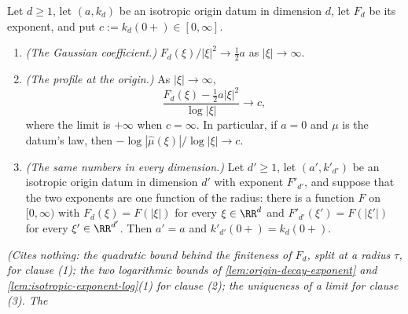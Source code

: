 \begin{theorem}
\label{cor:origin-profile-exponent}
\leanok
Let $d \ge 1$, let $(a, k_d)$ be an isotropic origin datum in dimension $d$, let $F_d$ be its
exponent, and put $c := k_d(0{+}) \in [0,\infty]$.
\begin{enumerate}
\item \emph{(The Gaussian coefficient.)} $F_d(\xi)/|\xi|^2 \to \tfrac12 a$ as $|\xi| \to \infty$.
\item \emph{(The profile at the origin.)} As $|\xi| \to \infty$,
\[
  \frac{F_d(\xi) - \tfrac12 a|\xi|^2}{\log|\xi|} \to c ,
\]
where the limit is $+\infty$ when $c = \infty$. In particular, if $a = 0$ and $\mu$ is the datum's
law, then $-\log|\widehat\mu(\xi)|/\log|\xi| \to c$.
\item \emph{(The same numbers in every dimension.)} Let $d' \ge 1$, let $(a', k'_{d'})$ be an
isotropic origin datum in dimension $d'$ with exponent $F'_{d'}$, and suppose that the two exponents
are one function of the radius: there is a function $F$ on $[0,\infty)$ with $F_d(\xi) = F(|\xi|)$
for every $\xi \in \RR^d$ and $F'_{d'}(\xi') = F(|\xi'|)$ for every $\xi' \in \RR^{d'}$. Then
$a' = a$ and $k'_{d'}(0{+}) = k_d(0{+})$.
\end{enumerate}
\statusT\quad\emph{(Cites nothing: the quadratic bound behind the finiteness of $F_d$, split at a
radius $\tau$, for clause (1); the two logarithmic bounds of \ref{lem:origin-decay-exponent} and
\ref{lem:isotropic-exponent-log}(1) for clause (2); the uniqueness of a limit for clause (3). The
}
\end{theorem}
